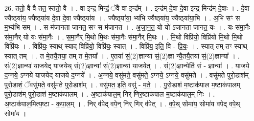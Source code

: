 \documentclass[17pt]{extarticle}
\begin{document}
26. ततो॒ वै वै तत॒ स्ततो॒ वै । . वा इन्द्र॒ मिन्द्रं॒ ॅवै वा इन्द्र᳚म् । . इन्द्र॑म् दे॒वा दे॒वा इन्द्र॒ मिन्द्र॑म् दे॒वाः । . दे॒वा ज्यैष्ठ्‍या॑य॒ ज्यैष्ठ्‍या॑य दे॒वा दे॒वा ज्यैष्ठ्‍या॑य । . ज्यैष्ठ्‍या॑या॒ भ्य॑भि ज्यैष्ठ्‍या॑य॒ ज्यैष्ठ्‍या॑या॒भि । . अ॒भि सꣳ स म॒भ्य॑भि सम् । . स म॑जानता जानत॒ सꣳ स म॑जानत । . अ॒जा॒न॒त॒ यो यो॑ ऽजानता जानत॒ यः । . यः स॑मा॒नैः स॑मा॒नैर् यो यः स॑मा॒नैः । . स॒मा॒नैर् मि॒थो मि॒थः स॑मा॒नैः स॑मा॒नैर् मि॒थः । . मि॒थो विप्रि॑यो॒ विप्रि॑यो मि॒थो मि॒थो विप्रि॑यः । . विप्रि॑यः॒ स्याथ् स्याद् विप्रि॑यो॒ विप्रि॑यः॒ स्यात् । . विप्रि॑य॒ इति॒ वि - प्रि॒यः॒ । . स्यात् तम् तꣳ स्याथ् स्यात् तम् । . त मे॒तयै॒तया॒ तम् त मे॒तया᳚ । . ए॒तया॑ सं॒(2)ज्ञान्या॑ सं॒(2)ज्ञा न्यै॒तयै॒तया॑ सं॒(2)ज्ञान्या᳚ । . सं॒(2)ज्ञान्या॑ याजयेद् याजयेथ् सं॒(2)ज्ञान्या॑ सं॒(2)ज्ञान्या॑ याजयेत् । . सं॒(2)ज्ञान्येति॑ सं - ज्ञान्या᳚ । . या॒ज॒ये॒ द॒ग्नये॒ ऽग्नये॑ याजयेद् याजये द॒ग्नये᳚ । . अ॒ग्नये॒ वसु॑मते॒ वसु॑मते॒ ऽग्नये॒ ऽग्नये॒ वसु॑मते । . वसु॑मते पुरो॒डाश॑म् पुरो॒डाशं॒ ॅवसु॑मते॒ वसु॑मते पुरो॒डाश᳚म् । . वसु॑मत॒ इति॒ वसु॑ - म॒ते॒ । . पु॒रो॒डाश॑ म॒ष्टाक॑पाल म॒ष्टाक॑पालम् पुरो॒डाश॑म् पुरो॒डाश॑ म॒ष्टाक॑पालम् । . अ॒ष्टाक॑पाल॒म् निर् णिर॒ष्टाक॑पाल म॒ष्टाक॑पाल॒म् निः । . अ॒ष्टाक॑पाल॒मित्य॒ष्टा - क॒पा॒ल॒म् । . निर् व॑पेद् वपे॒न् निर् णिर् व॑पेत् । . व॒पे॒थ् सोमा॑य॒ सोमा॑य वपेद् वपे॒थ् सोमा॑य । \newline
\end{document}
